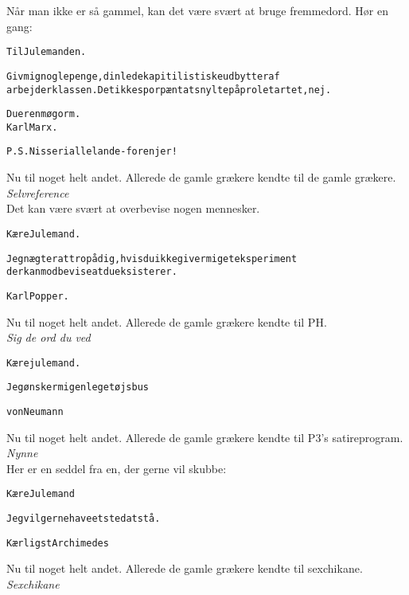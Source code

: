 \documentclass[a4paper,11pt]{article}
\begin{document}
\pagebreak

\noindent
N\aa{}r man ikke er s\aa{} gammel, kan det v\ae{}re sv\ae{}rt at bruge fremmedord.
H\o{}r en gang:
\begin{alltt}
{\rm 
Til Julemanden.

Giv mig nogle penge, din lede kapitilistiske udbytter af
arbejderklassen. Det ikke spor p\ae{}nt at snylte p\aa{} proletartet, nej.

                            Du er en m\o{}gorm.
                            Karl Marx.

P.S. Nisser i alle lande - foren jer !
}
\end{alltt}
Nu til noget helt andet. Allerede de gamle gr\ae{}kere kendte til de gamle gr\ae{}kere. \\
{\em Selvreference} \\
Det kan v\ae{}re sv\ae{}rt at overbevise nogen mennesker.
\begin{alltt}
{\rm
K\ae{}re Julemand.

Jeg n\ae{}gter at tro p\aa{} dig, hvis du ikke giver mig et eksperiment
der kan modbevise at du eksisterer.

                            Karl Popper.
}
\end{alltt}
Nu til noget helt andet. Allerede de gamle gr\ae{}kere kendte til PH.
\\ 
{\em Sig de ord du ved} \\
\begin{alltt}
{\rm
K\ae{}re julemand.

Jeg \o{}nsker mig en leget\o{}jsbus

                            von Neumann
}
\end{alltt}
Nu til noget helt andet. Allerede de gamle gr\ae{}kere kendte til P3's satireprogram. \\
{\em Nynne} \\
Her er en seddel fra en, der gerne vil skubbe: \\
\begin{alltt}
{\rm
K\ae{}re Julemand

Jeg vil gerne have et sted at st\aa{}.

                            K\ae{}rligst Archimedes
}
\end{alltt}
Nu til noget helt andet. Allerede de gamle gr\ae{}kere kendte til sexchikane. \\
{\em Sexchikane} \\

\pagebreak
\end{document}
